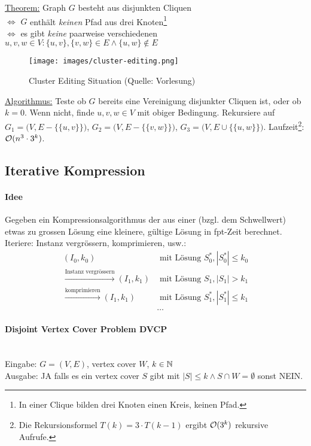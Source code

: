 \underline{Theorem:}
Graph $G$ besteht aus disjunkten Cliquen \\
$\iff$ $G$ enthält \emph{keinen} Pfad aus drei Knoten\footnote{In einer Clique bilden drei Knoten einen Kreis, keinen Pfad.}\\
$\iff$ es gibt \emph{keine} paarweise verschiedenen $u, v, w \in V : \{u,v\}, \{v,w\} \in E \wedge \{u,w\} \notin E$

\begin{figure}[h]
    \centering
    \texttt{[image: images/cluster-editing.png]}
    \caption{Cluster Editing Situation (Quelle: Vorlesung)}
    \label{fig:cluster-editing}
\end{figure}

\underline{Algorithmus:}
Teste ob $G$ bereits eine Vereinigung disjunkter Cliquen ist, oder ob $k=0$.
Wenn nicht, finde $u,v,w \in V$ mit obiger Bedingung.
Rekursiere auf
$G_1 = \big(V, E   -  \{ \{u,v\} \} \big)$,
$G_2 = \big(V, E   -  \{ \{v,w\} \} \big)$,
$G_3 = \big(V, E \cup \{ \{u,w\} \} \big)$.
Laufzeit\footnote{Die Rekursionsformel $T(k) = 3 \cdot T(k-1)$ ergibt $\mathcal{O} (3^k)$ rekursive Aufrufe.}:
$\mathcal{O} (n^3 \cdot 3^k)$.


\subsection{Iterative Kompression}

\paragraph{Idee}
Gegeben ein Kompressionsalgorithmus der aus einer (bzgl. dem Schwellwert) etwas zu grossen Lösung eine kleinere,
gültige Lösung in fpt-Zeit berechnet.
Iteriere: Instanz vergrössern, komprimieren, usw.:
\\
\begin{align*}
(I_0, k_0) & \text{ mit Lösung } S_0^*, |S_0^*| \leq k_0 \\
\xrightarrow{\text{Instanz vergrössern}}
(I_1, k_1) & \text{ mit Lösung } S_1,   |S_1|   > k_1 \\
\xrightarrow{\text{komprimieren}}
(I_1, k_1) & \text{ mit Lösung } S_1^*, |S_1^*| \leq k_1 \\
& \dots
\end{align*}

\paragraph{Disjoint Vertex Cover Problem DVCP} \mbox{} \\
Eingabe: $G=(V,E)$, vertex cover $W$, $k \in \mathbb{N}$ \\
Ausgabe: JA falls es ein vertex cover $S$ gibt mit $|S| \leq k \wedge S \cap W = \emptyset$ sonst NEIN.


